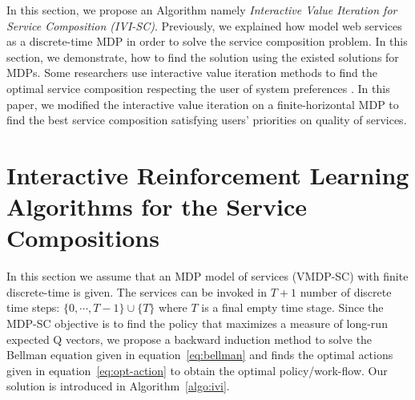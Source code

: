 \documentclass[10pt,journal,compsoc]{IEEEtran}
\begin{document}
In this section, we propose an Algorithm namely \emph{Interactive Value Iteration for Service Composition (IVI-SC)}. Previously, we explained how model web services as a discrete-time MDP in order to solve the service composition problem. In this section, we demonstrate, how to find the solution using the existed solutions for MDPs. Some researchers use interactive value iteration methods to find the optimal service composition respecting the user of system preferences \cite{weng:hal-00942290,alizadeh:hal-01358345}. In this paper, we modified the interactive value iteration on a finite-horizontal MDP to find the best service composition satisfying users' priorities on quality of services. 

\section{Interactive Reinforcement Learning Algorithms for the Service Compositions}

In this section we assume that an MDP model of services (VMDP-SC) with finite discrete-time is given. The services can be invoked in $T+1$ number of discrete time steps: $\{0, \cdots,T-1 \} \cup \{T\}$ where $T$ is a final empty time stage. %
Since the MDP-SC objective is to find the policy that maximizes a measure of long-run expected Q vectors, we propose a backward induction method to solve the Bellman equation given in equation~\ref{eq:bellman} and finds the optimal actions given in equation~\ref{eq:opt-action} to obtain the optimal policy/work-flow. Our solution is introduced in Algorithm~\ref{algo:ivi}.
\end{document}
